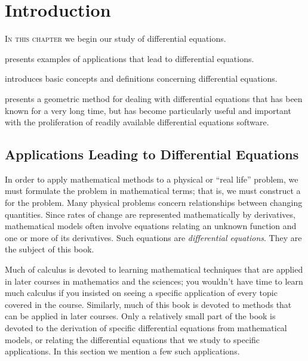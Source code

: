 
\chapter{Introduction}\label{ch:intro}

\noindent
\textsc{In this chapter} we begin our study of differential equations.

\medskip\noindent
{} presents
examples of applications that lead to differential equations.

\medskip\noindent
{} introduces basic concepts and
definitions concerning differential equations.

\medskip\noindent
{} presents a geometric method for dealing with
differential equations that has been known for a very long time,
but has become particularly useful and important with the proliferation of
readily available differential equations software.

\newpage

\section{Applications Leading to Differential Equations}
\label{sec:apps_leading_DEs}

In order to apply mathematical methods to a physical or ``real life''
problem, we must  formulate the problem in mathematical
terms; that is, we must construct a  for the
problem. Many physical problems concern relationships between changing
quantities. Since rates of change are represented mathematically by
derivatives, mathematical models often involve equations relating an
unknown function and one or more of its derivatives. Such equations
are  \emph{\color{blue}differential equations}. They are the subject of this
book.

Much of calculus is devoted to learning mathematical techniques that
are applied in later courses in mathematics and the sciences;     you
wouldn't have time to learn much calculus if you insisted on seeing
a specific application of every topic covered in the course.
Similarly, much of this book is devoted to methods that can be applied
in later courses. Only a relatively small part of the book is devoted
to the derivation of specific differential equations from mathematical
models, or relating the differential equations that we study to
specific applications. In this section we mention a few such
applications.

